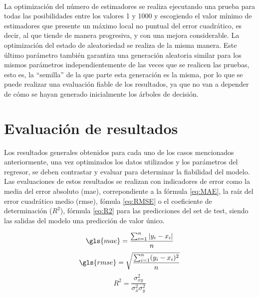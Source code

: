\\
\par La optimización del número de estimadores se realiza ejecutando una prueba para todas las posibilidades entre los valores 1 y 1000 y escogiendo el valor mínimo de estimadores que presente un máximo local no puntual del error cuadrático, es decir, al que tiende de manera progresiva, y con una mejora considerable. La optimización del estado de aleatoriedad se realiza de la misma manera. Este último parámetro también garantiza una generación aleatoria similar para los mismos parámetros independientemente de las veces que se realicen las pruebas, esto es, la ``semilla'' de la que parte esta generación es la misma, por lo que se puede realizar una evaluación fiable de los resultados, ya que no van a depender de cómo se hayan generado inicialmente los árboles de decisión. 
\section{Evaluación de resultados}
\par Los resultados generales obtenidos para cada uno de los casos mencionados anteriormente, una vez optimizados los datos utilizados y los parámetros del regresor, se deben contrastar y evaluar para determinar la fiabilidad del modelo. Las evaluaciones de estos resultados se realizan con indicadores de error como la media del error absoluto (\gls{mae}), correpondiente a la fórmula \ref{eq:MAE}, la raíz del error cuadrático medio (\gls{rmse}), fómula \ref{eq:RMSE} o el coeficiente de determinación ($R^2$), fórmula \ref{eq:R2} para las predicciones del set de test, siendo las salidas del modelo una predicción de valor único.

\begin{equation}\label{eq:MAE}
\gls{mae} = \frac{\sum_{i=1}^{n} \left | y_i -x_i \right |}{n}
\end{equation} 
\begin{equation}\label{eq:RMSE}
\gls{rmse} = \sqrt{\frac{\sum_{i=1}^{n}(y_i- x_i )^2}{n}}
\end{equation}
\begin{equation}\label{eq:R2}
R^2 = \frac{\sigma^2_{xy}}{\sigma^2_x\sigma^2_y}
\end{equation}

